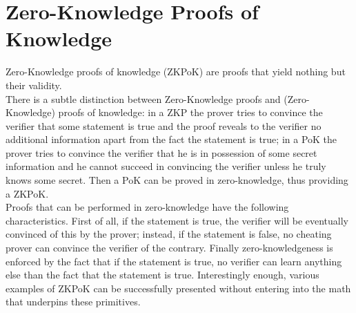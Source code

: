 \section{Zero-Knowledge Proofs of Knowledge}
Zero-Knowledge proofs of knowledge (ZKPoK) are proofs that yield nothing but their validity.\\
There is a subtle distinction between Zero-Knowledge proofs and (Zero-Knowledge) proofs of knowledge: in a ZKP the prover tries to convince the verifier that some statement is true and the proof reveals to the verifier no additional information apart from the fact the statement is true; in a PoK the prover tries to convince the verifier that he is in possession of some secret information and he cannot succeed in convincing the verifier unless he truly knows some secret. Then a PoK can be proved in zero-knowledge, thus providing a ZKPoK.\\
Proofs that can be performed in zero-knowledge have the following characteristics. First of all, if the statement is true, the verifier will be eventually convinced of this by the prover; instead, if the statement is false, no cheating prover can convince the verifier of the contrary. Finally zero-knowledgeness is enforced by the fact that if the statement is true, no verifier can learn anything else than the fact that the statement is true. Interestingly enough, various examples of ZKPoK can be successfully presented without entering into the math that underpins these primitives.
